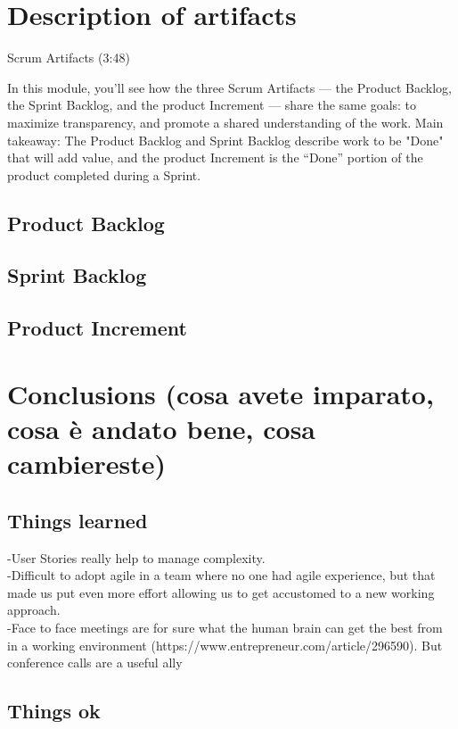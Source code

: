 \documentclass[a4paper,12pt]{report}
\begin{document}
\chapter{Description of artifacts}
Scrum Artifacts (3:48)

In this module, you’ll see how the three Scrum Artifacts — the Product Backlog, the Sprint Backlog, and the product Increment — share the same goals: to maximize transparency, and promote a shared understanding of the work. Main takeaway: The Product Backlog and Sprint Backlog describe work to be "Done" that will add value, and the product Increment is the “Done” portion of the product completed during a Sprint.

\section{Product Backlog}

\section{Sprint Backlog}

\section{Product Increment}

\chapter{Conclusions (cosa avete imparato, cosa è andato bene, cosa cambiereste)}

\section{Things learned}
-User Stories really help to manage complexity.\\
-Difficult to adopt agile in a team where no one had agile experience, but that made us put even more effort allowing us to get accustomed to a new working approach.\\
-Face to face meetings are for sure what the human brain can get the best from in a working environment (https://www.entrepreneur.com/article/296590). But conference calls are a useful ally

\section{Things ok}
\end{document}
